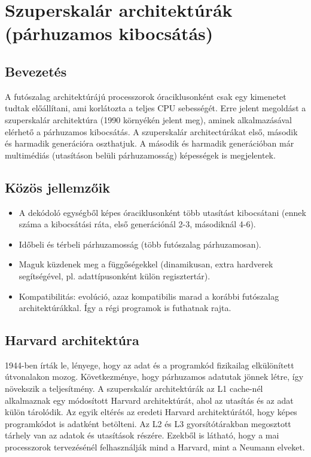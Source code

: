 
\chapter{Szuperskalár architektúrák (párhuzamos kibocsátás)}

\section{Bevezetés}
A futószalag architektúrájú processzorok óraciklusonként csak egy kimenetet tudtak előállítani, ami korlátozta a teljes CPU sebességét.
Erre jelent megoldást a szuperskalár architektúra (1990 környékén jelent meg), aminek alkalmazásával elérhető a párhuzamos kibocsátás.
A szuperskalár architectúrákat első, második és harmadik generációra oszthatjuk.
A második és harmadik generációban már multimédiás (utasításon belüli párhuzamosság) képességek is megjelentek.

\section{Közös jellemzőik}
\begin{itemize}
    \item A dekódoló egységből képes óraciklusonként több utasítást kibocsátani (ennek száma a kibocsátási ráta, első generációnál 2-3, másodiknál 4-6).
    \item Időbeli és térbeli párhuzamosság (több futószalag párhuzamosan).
    \item Maguk küzdenek meg a függőségekkel (dinamikusan, extra hardverek segítségével, pl. adattípusonként külön regisztertár).
    \item Kompatibilitás: evolúció, azaz kompatibilis marad a korábbi futószalag architektúrákkal. Így a régi programok is futhatnak rajta.
\end{itemize}

\section{Harvard architektúra}
1944-ben írták le, lényege, hogy az adat és a programkód fizikailag elkülönített útvonalakon mozog.
Következménye, hogy párhuzamos adatutak jönnek létre, így növekszik a teljesítmény.
A szuperskalár architektúrák az L1 cache-nél alkalmaznak egy módosított Harvard architektúrát, ahol az utasítás és az adat külön tárolódik.
Az egyik eltérés az eredeti Harvard architektúrától, hogy képes programkódot is adatként betölteni.
Az L2 és L3 gyorsítótárakban megosztott tárhely van az adatok és utasítások részére.
Ezekből is látható, hogy a mai processzorok tervezésénél felhasználják mind a Harvard, mint a Neumann elveket.

